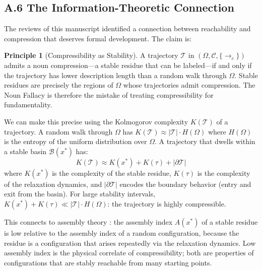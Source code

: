 \documentclass[12pt, a4paper]{article}
\theoremstyle{plain}
\theoremstyle{definition}
\newtheorem{principle}[theorem]{Principle}
\theoremstyle{remark}
\begin{document}
\subsection*{A.6 The Information-Theoretic Connection}

The reviews of this manuscript identified a connection between reachability
and compression that deserves formal development. The claim is:

\begin{principle}[Compressibility as Stability]
\label{prin:compress}
A trajectory $\mathcal{T}$ in $(\Omega, \mathcal{C}, \{\to_c\})$ admits a
noun compression---a stable residue that can be labeled---if and only if
the trajectory has lower description length than a random walk through $\Omega$.
Stable residues are precisely the regions of $\Omega$ whose trajectories
admit compression. The Noun Fallacy is therefore the mistake of treating
compressibility for fundamentality.
\end{principle}

We can make this precise using the Kolmogorov complexity $K(\mathcal{T})$ of
a trajectory. A random walk through $\Omega$ has $K(\mathcal{T}) \approx
|\mathcal{T}| \cdot H(\Omega)$ where $H(\Omega)$ is the entropy of the
uniform distribution over $\Omega$. A trajectory that dwells within a
stable basin $\mathcal{B}(x^*)$ has:
$$K(\mathcal{T}) \approx K(x^*) + K(\tau) + |\partial\mathcal{T}|$$
where $K(x^*)$ is the complexity of the stable residue, $K(\tau)$ is the
complexity of the relaxation dynamics, and $|\partial\mathcal{T}|$ encodes
the boundary behavior (entry and exit from the basin). For large stability
intervals, $K(x^*) + K(\tau) \ll |\mathcal{T}| \cdot H(\Omega)$: the
trajectory is highly compressible.

This connects to assembly theory \citep{cronin2020assembly}: the assembly
index $A(x^*)$ of a stable residue is low relative to the assembly index
of a random configuration, because the residue is a configuration that
arises repeatedly via the relaxation dynamics. Low assembly index is the
physical correlate of compressibility; both are properties of configurations
that are stably reachable from many starting points.
\end{document}
